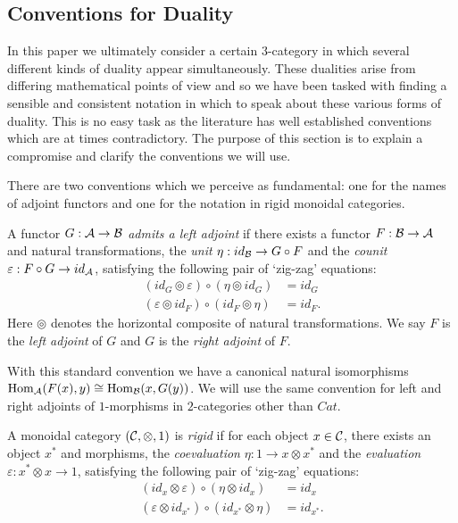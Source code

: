 \documentclass{amsart}
\begin{document}
\subsection{Conventions for Duality}

In this paper we ultimately consider a certain 3-category in which several different kinds of duality appear simultaneously. These dualities arise from differing mathematical points of view and so we have been tasked with finding a sensible and consistent notation in which to speak about these various forms of duality. This is no easy task as the literature has well established conventions which are at times contradictory.  The purpose of this section is to explain a compromise and clarify the conventions we will use.

There are two conventions which we perceive as fundamental: one for the names of adjoint functors and one for the notation in rigid monoidal categories. 
\begin{definition} [Convention A]
	A functor $G: \mathcal A \to \mathcal B$ {\em admits a left adjoint} if there exists a functor $F: \mathcal B \to \mathcal A$ and natural transformations, the {\em unit} $\eta: id_{\mathcal B} \to G \circ F$ and the {\em counit} $\varepsilon: F \circ G \to id_{\mathcal A}$, satisfying the following pair of `zig-zag' equations:
	\begin{align*}
		(id_{G} \circledcirc \varepsilon  ) \circ (  \eta \circledcirc id_{G}) &= id_{G} \\
		(\varepsilon \circledcirc id_{F}) \circ (id_{F} \circledcirc \eta) &= id_{F}.
	\end{align*}
Here $\circledcirc$ denotes the horizontal composite of natural transformations.
We say $F$ is the {\em left adjoint} of $G$ and $G$ is the {\em right adjoint} of $F$. 
\end{definition}
With this standard convention we have a canonical natural isomorphisms $\operatorname{Hom}_\mathcal A(F(x), y) \cong \operatorname{Hom}_\mathcal B(x, G(y))$. We will use the same convention for left and right adjoints of $1$-morphisms in $2$-categories other than $Cat$.

\begin{definition}[Convention B] \label{def:rigid}
	A monoidal category $(\mathcal C, \otimes, 1)$ is {\em rigid} if for each object $x \in \mathcal C$, there exists an object $x^*$ and morphisms, the {\em coevaluation} $\eta: 1 \to x \otimes x^*$ and the {\em evaluation} $\varepsilon: x^* \otimes x \to 1$, satisfying the following pair of `zig-zag' equations:
	\begin{align*}
		(id_{x} \otimes \varepsilon  ) \circ (  \eta \otimes id_{x}) &= id_{x} \\
		(\varepsilon \otimes id_{x^*}) \circ (id_{x^*} \otimes \eta) &= id_{x^*}.
	\end{align*}
\end{definition}
\end{document}
